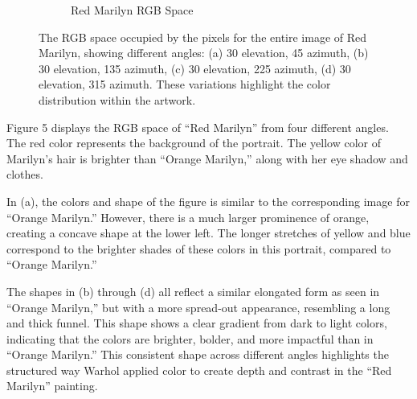 \documentclass{article}
\begin{document}
\begin{figure}[ht]
\begin{subfigure}{0.45\textwidth}
    \caption{Red Marilyn RGB Space}
    \label{fig:4_8_red_marilyn_original_scatter}
  \end{subfigure}
  \caption{The RGB space occupied by the pixels for the entire image of Red Marilyn, showing different angles: (a) 30 \degree elevation, 45 \degree azimuth, (b) 30 \degree elevation, 135 \degree azimuth, (c) 30 \degree elevation, 225 \degree azimuth, (d) 30 \degree elevation, 315 \degree azimuth. These variations highlight the color distribution within the artwork.}
  \label{fig:red_marilyn_original_scatter_2}
\end{figure}

Figure 5 displays the RGB space of ``Red Marilyn'' from four different
angles. The red color represents the background of the portrait. The
yellow color of Marilyn's hair is brighter than ``Orange Marilyn,''
along with her eye shadow and clothes.

In (a), the colors and shape of the figure is similar to the
corresponding image for ``Orange Marilyn.'' However, there is a much
larger prominence of orange, creating a concave shape at the lower left.
The longer stretches of yellow and blue correspond to the brighter
shades of these colors in this portrait, compared to ``Orange Marilyn.''

The shapes in (b) through (d) all reflect a similar elongated form as
seen in ``Orange Marilyn,'' but with a more spread-out appearance,
resembling a long and thick funnel. This shape shows a clear gradient
from dark to light colors, indicating that the colors are brighter,
bolder, and more impactful than in ``Orange Marilyn.'' This consistent
shape across different angles highlights the structured way Warhol
applied color to create depth and contrast in the ``Red Marilyn''
painting.
\end{document}
